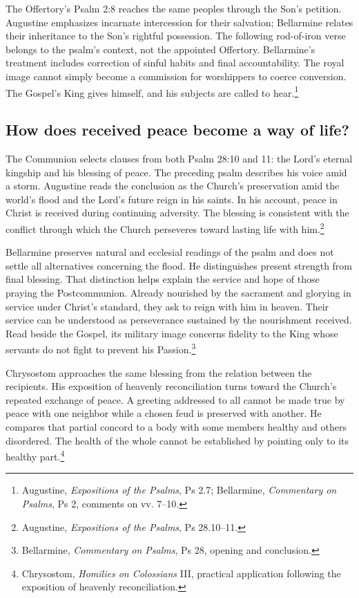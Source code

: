The Offertory's Psalm 2:8 reaches the same peoples through the Son's petition. Augustine emphasizes incarnate intercession for their salvation; Bellarmine relates their inheritance to the Son's rightful possession. The following rod-of-iron verse belongs to the psalm's context, not the appointed Offertory. Bellarmine's treatment includes correction of sinful habits and final accountability. The royal image cannot simply become a commission for worshippers to coerce conversion. The Gospel's King gives himself, and his subjects are called to hear.\footnote{Augustine, \emph{Expositions of the Psalms}, Ps 2.7; Bellarmine, \emph{Commentary on Psalms}, Ps 2, comments on vv. 7--10.}

\subsection{How does received peace become a way of life?}
The Communion selects clauses from both Psalm 28:10 and 11: the Lord's eternal kingship and his blessing of peace. The preceding psalm describes his voice amid a storm. Augustine reads the conclusion as the Church's preservation amid the world's flood and the Lord's future reign in his saints. In his account, peace in Christ is received during continuing adversity. The blessing is consistent with the conflict through which the Church perseveres toward lasting life with him.\footnote{Augustine, \emph{Expositions of the Psalms}, Ps 28.10--11.}

Bellarmine preserves natural and ecclesial readings of the psalm and does not settle all alternatives concerning the flood. He distinguishes present strength from final blessing. That distinction helps explain the service and hope of those praying the Postcommunion. Already nourished by the sacrament and glorying in service under Christ's standard, they ask to reign with him in heaven. Their service can be understood as perseverance sustained by the nourishment received. Read beside the Gospel, its military image concerns fidelity to the King whose servants do not fight to prevent his Passion.\footnote{Bellarmine, \emph{Commentary on Psalms}, Ps 28, opening and conclusion.}

Chrysostom approaches the same blessing from the relation between the recipients. His exposition of heavenly reconciliation turns toward the Church's repeated exchange of peace. A greeting addressed to all cannot be made true by peace with one neighbor while a chosen feud is preserved with another. He compares that partial concord to a body with some members healthy and others disordered. The health of the whole cannot be established by pointing only to its healthy part.\footnote{Chrysostom, \emph{Homilies on Colossians} III, practical application following the exposition of heavenly reconciliation.}

